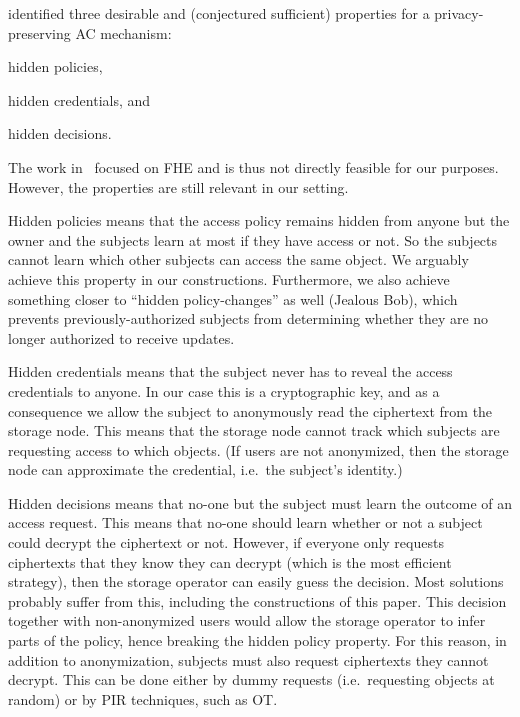 \citet{TowardsPPACwHPHCHD} identified three desirable and (conjectured 
sufficient) properties for a privacy-preserving \ac{AC} mechanism:
\begin{inparablank}
\item hidden policies,
\item hidden credentials, and
\item hidden decisions.
\end{inparablank}
The work in~\cite{TowardsPPACwHPHCHD} focused on \ac{FHE} and is thus not 
directly feasible for our purposes.
However, the properties are still relevant in our setting.

Hidden policies means that the access policy remains hidden from anyone but 
the owner and the subjects learn at most if they have access or not.
So the subjects cannot learn which other subjects can access the same object.
We arguably achieve this property in our constructions.
Furthermore, we also achieve something closer to \enquote{hidden 
  policy-changes} as well (Jealous Bob), which prevents previously-authorized 
subjects from determining whether they are no longer authorized to receive 
updates.


Hidden credentials means that the subject never has to reveal the access 
credentials to anyone.
In our case this is a cryptographic key, and as a consequence we allow the 
subject to anonymously read the ciphertext from the storage node.
This means that the storage node cannot track which subjects are requesting 
access to which objects.
(If users are not anonymized, then the storage node can approximate the 
credential, i.e.\ the subject's identity.)

Hidden decisions means that no-one but the subject must learn the outcome of an 
access request.
This means that no-one should learn whether or not a subject could decrypt the 
ciphertext or not.
However, if everyone only requests ciphertexts that they know they can decrypt 
(which is the most efficient strategy), then the storage operator can easily 
guess the decision.
Most solutions probably suffer from this, including the constructions of this 
paper.
This decision together with non-anonymized users would allow the storage 
operator to infer parts of the policy, hence breaking the hidden policy 
property.
For this reason, in addition to anonymization, subjects must also request 
ciphertexts they cannot decrypt.
This can be done either by dummy requests (i.e.\ requesting objects at random) 
or by \ac{PIR} techniques, such as \ac{OT}.


